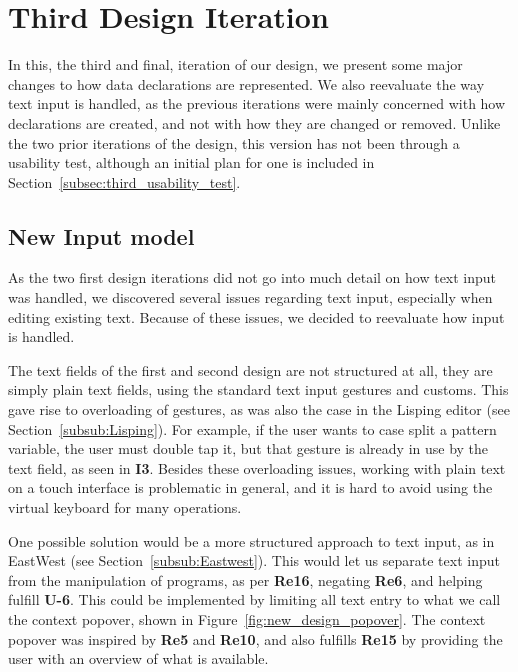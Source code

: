 \chapter{Third Design Iteration}
\label{sec:third_design_iteration}
In this, the third and final, iteration of our design, we present some major changes to how data declarations are represented.
We also reevaluate the way text input is handled, as the previous iterations were mainly concerned with how declarations are created, and not with how they are changed or removed.
Unlike the two prior iterations of the design, this version has not been through a usability test, although an initial plan for one is included in Section~\ref{subsec:third_usability_test}.

\section{New Input model}
\label{subsec:new_input_model}
As the two first design iterations did not go into much detail on how text input was handled, we discovered several issues regarding text input, especially when editing existing text.
Because of these issues, we decided to reevaluate how input is handled.

The text fields of the first and second design are not structured at all, they are simply plain text fields, using the standard text input gestures and customs.
This gave rise to overloading of gestures, as was also the case in the Lisping editor (see Section~\ref{subsub:Lisping}).
For example, if the user wants to case split a pattern variable, the user must double tap it, but that gesture is already in use by the text field, as seen in \textbf{I3}.
Besides these overloading issues, working with plain text on a touch interface is problematic in general, and it is hard to avoid using the virtual keyboard for many operations.

One possible solution would be a more structured approach to text input, as in EastWest (see Section~\ref{subsub:Eastwest}).
This would let us separate text input from the manipulation of programs, as per \textbf{Re16}, negating \textbf{Re6}, and helping fulfill \textbf{U-6}.
This could be implemented by limiting all text entry to what we call the context popover, shown in Figure~\ref{fig:new_design_popover}.
The context popover was inspired by \textbf{Re5} and \textbf{Re10}, and also fulfills \textbf{Re15} by providing the user with an overview of what is available.

